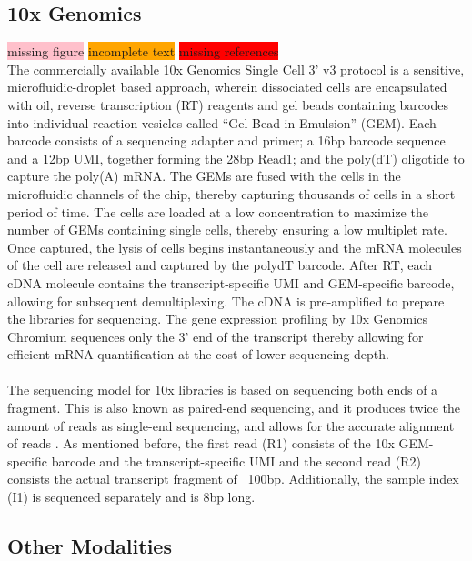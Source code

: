  \subsection{10x Genomics}
 \colorbox{pink}{missing figure} \colorbox{orange}{incomplete text} \colorbox{red}{missing references}\\
\label{sec:scrna_10x}
The commercially available 10x Genomics Single Cell 3’ v3 protocol is a sensitive, microfluidic-droplet based approach, wherein dissociated cells are encapsulated with oil, reverse transcription (RT) reagents and gel beads containing barcodes into individual reaction vesicles called “Gel Bead in Emulsion” (GEM). Each barcode consists of a sequencing adapter and primer; a 16bp barcode sequence and a 12bp UMI, together forming the 28bp Read1; and the poly(dT) oligotide to capture the poly(A) mRNA. The GEMs are fused with the cells in the microfluidic channels of the chip, thereby capturing thousands of cells in a short period of time. The cells are loaded at a low concentration to maximize the number of GEMs containing single cells, thereby ensuring a low multiplet rate. Once captured, the lysis of cells begins instantaneously and the mRNA molecules of the cell are released and captured by the polydT barcode. After RT, each cDNA molecule contains the transcript-specific UMI and GEM-specific barcode, allowing for subsequent demultiplexing. The cDNA is pre-amplified to prepare the libraries for sequencing. The gene expression profiling by 10x Genomics Chromium sequences only the 3’ end of the transcript thereby allowing for efficient mRNA quantification at the cost of lower sequencing depth.\\\\
The sequencing model for 10x libraries is based on sequencing both ends of a fragment. This is also known as paired-end sequencing, and it produces twice the amount of reads as single-end sequencing, and allows for the accurate alignment of reads \textbf{\cite{noauthor_paired-end_nodate}}. As mentioned before, the first read (R1) consists of the 10x GEM-specific barcode and the transcript-specific UMI and the second read (R2) consists the actual transcript fragment of ~100bp. Additionally, the sample index (I1) is sequenced separately and is 8bp long.

\subsection{Other Modalities}
\label{sec:scrna_modalities}

